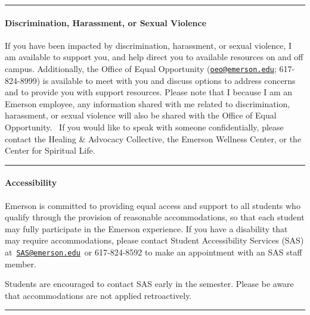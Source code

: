 \documentclass[
  letterpaper,
  DIV=11,
  numbers=noendperiod]{scrartcl}
\let\oldparagraph\paragraph
\renewcommand{\paragraph}[1]{\oldparagraph{#1}\mbox{}}
\begin{document}
\begin{center}\rule{0.5\linewidth}{0.5pt}\end{center}

\hypertarget{discrimination-harassment-or-sexual-violence}{%
\paragraph{Discrimination, Harassment, or Sexual
Violence}\label{discrimination-harassment-or-sexual-violence}}

If you have been impacted by discrimination, harassment, or sexual
violence, I am available to support you, and help direct you to
available resources on and off campus. Additionally, the Office of Equal
Opportunity (\href{mailto:oeo@emerson.edu}{\nolinkurl{oeo@emerson.edu}};
617-824-8999) is available to meet with you and discuss options to
address concerns and to provide you with support resources. Please note
that I because I am an Emerson employee, any information shared with me
related to discrimination, harassment, or sexual violence will also be
shared with the Office of Equal Opportunity. ~If you would like to speak
with someone confidentially, please contact the Healing \& Advocacy
Collective, the Emerson Wellness Center, or the Center for Spiritual
Life.

\begin{center}\rule{0.5\linewidth}{0.5pt}\end{center}

\hypertarget{accessibility}{%
\paragraph{Accessibility}\label{accessibility}}

Emerson is committed to providing equal access and support to all
students who qualify through the provision of reasonable accommodations,
so that each student may fully participate in the Emerson experience. If
you have a disability that may require accommodations, please contact
Student Accessibility Services (SAS)
at~\href{mailto:SAS@emerson.edu}{\nolinkurl{SAS@emerson.edu}}~or
617-824-8592 to make an appointment with an SAS staff member.

Students are encouraged to contact SAS early in the semester. Please be
aware that accommodations are not applied retroactively.

\begin{center}\rule{0.5\linewidth}{0.5pt}\end{center}
\end{document}
